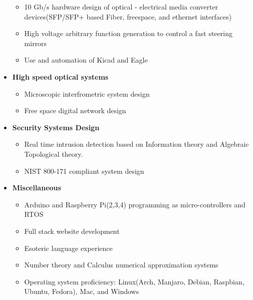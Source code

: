 \documentclass[10pt]{extarticle}
\theoremstyle{plain}
\theoremstyle{Definition}
\theoremstyle{Definition}
\theoremstyle{plain}
\begin{document}
\begin{itemize}
			\begin{itemize}
				\item 10 Gb/s hardware design of optical - electrical media converter devices(SFP/SFP+ based Fiber, freespace, and ethernet interfaces)
				\item High voltage arbitrary function generation to control a fast steering mirrors
				\item Use and automation of Kicad and Eagle
			\end{itemize}			
			\item \textbf{High speed optical systems }
			\begin{itemize}
				\item Microscopic interfrometric system design
				\item Free space digital network design
			\end{itemize}
			\item \textbf{Security Systems Design}
			\begin{itemize}
				\item Real time intrusion detection based on Information theory and Algebraic Topological theory. 
				\item NIST 800-171 compliant system design
			\end{itemize}
			\item \textbf{Miscellaneous}
			\begin{itemize}
				\item Arduino and Raspberry Pi(2,3,4) programming as micro-controllers and RTOS
				\item Full stack website development
				\item Esoteric language experience
				\item Number theory and Calculus numerical approximation systems
				\item Operating system proficiency: Linux(Arch, Manjaro, Debian, Raspbian, Ubuntu, Fedora), Mac, and Windows
			\end{itemize}	
		\end{itemize}
\end{document}
